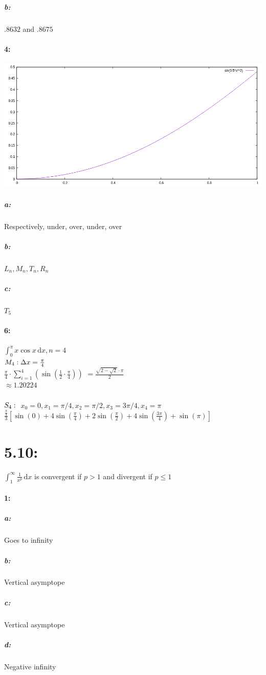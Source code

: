 \documentclass[12pt]{article}
\newcommand{\dx}{\mathrm{d}x}
\begin{document}
    \subparagraph*{b:}
    $.8632$ and $.8675$

    \paragraph*{4:\\}
    \includegraphics[scale=.666]{plot4.png}
    \subparagraph*{a:}
    Respectively, under, over, under, over
    \subparagraph*{b:}
    $L_n, M_n, T_n, R_n$
    \subparagraph*{c:}
    $T_5$
    
    \paragraph*{6:\\}
    $\int_{0}^{\pi} \! x \cos x \, \dx, n = 4$\\
    $M_4:\\ \Delta x = \frac{\pi}{4}$\\
    $\frac{\pi}{4} \cdot \sum\limits_{i=1}^{4} (\sin(\frac{1}{2} \cdot \frac{\pi}{4}))$
    $= \frac{\sqrt{2-\sqrt{2}}\cdot\pi}{2}$\\
    $\approx 1.20224$\\\\
    $S_4:\\$
    $x_0 = 0, x_1 = \pi/4, x_2 = \pi/2, x_3 = 3\pi/4, x_4 = \pi$\\
    $\frac{\frac{\pi}{4}}{3} [\sin(0) + 4\sin(\frac{\pi}{4}) + 2\sin(\frac{\pi}{2}) + 4\sin(\frac{3\pi}{4}) + \sin(\pi)]$

    \section{5.10:}
    $\int_{1}^{\infty} \! \frac{1}{x^p}\,\dx$ is convergent if $p > 1$ and divergent if $p \leq 1$
    \paragraph{1:\\}
    \subparagraph{a:} Goes to infinity
    \subparagraph{b:} Vertical asymptope
    \subparagraph{c:} Vertical asymptope
    \subparagraph{d:} Negative infinity
\end{document}
